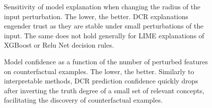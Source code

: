 \begin{figure}[t]
    \centering
    \caption{Sensitivity of model explanation when changing the radius of the input perturbation. The lower, the better. DCR explanations engender trust as they are stable under small perturbations of the input. The same does not hold generally for LIME explanations of XGBoost or Relu Net decision rules.}
    \label{fig:sensitivity}
\end{figure}

\begin{figure}[t]
    \centering
    \caption{Model confidence as a function of the number of perturbed features on counterfactual examples. The lower, the better. Similarly to interpretable methods, DCR prediction confidence quickly drops after inverting the truth degree of a small set of relevant concepts, facilitating the discovery of counterfactual examples. }
    \label{fig:counterfactuals}
\end{figure}


